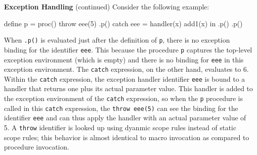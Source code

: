 \begin{minipage}[t]{\sw}
\slidenumber
\LARGE
{\bf Exception Handling} (continued)\exx
Consider the following example:
\Large
\begin{qv}
define p = proc() throw eee(5)
.p() %
catch
    eee = handler(x) add1(x)
in
    .p() %
.p() %
\end{qv}
\LARGE
When \verb'.p()' is evaluated just after the definition of \verb'p',
there is no exception binding for the identifier \verb'eee'.
This because the procedure \verb'p' captures
the top-level exception environment
(which is empty)
and there is no binding for \verb'eee' in this exception environment.\exx
The \verb'catch' expression, on the other hand, evaluates to 6.
Within the \verb'catch' expression,
the exception handler identifier \verb'eee' is bound
to a handler that returns one plus its actual parameter value.
This handler is added to the exception environment
of the \verb'catch' expression,
so when the \verb'p' procedure is called
in this \verb'catch' expression,
the \verb'throw eee(5)' can see the binding
for the identifier \verb'eee'
and can thus apply the handler with an actual parameter value of 5.
A \verb'throw' identifier is looked up
using dyanmic scope rules instead of static scope rules;
this behavior is almost identical
to macro invocation as compared to procedure invocation.
\end{minipage}
